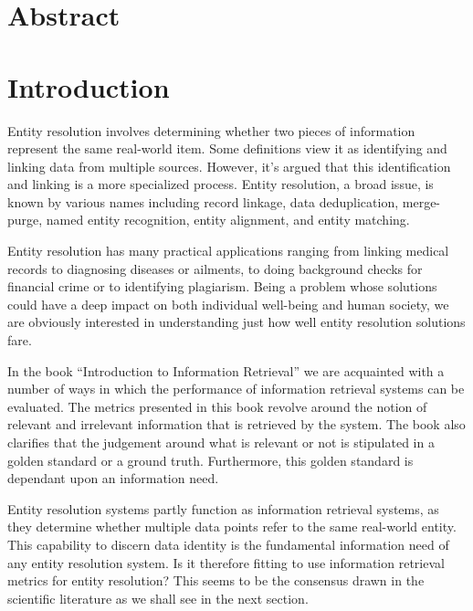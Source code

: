\documentclass[11pt]{article}
\begin{document}
    \theoremstyle{definition}
    \newtheorem{defn}{Definition}[section]
    
    \section{Abstract}\label{sec:abstract}


    \section{Introduction}\label{sec:introduction}
    Entity resolution involves determining whether two pieces of information
    represent the same real-world item.
    Some definitions view it as identifying and linking data from multiple
    sources\cite{Qia17}.
    However, it's argued that this identification and linking is a more
    specialized process\cite{Tal11}.
    Entity resolution, a broad issue, is known by various names including record
    linkage, data deduplication, merge-purge, named entity recognition, entity
    alignment, and entity matching.

    Entity resolution has many practical applications ranging from linking
    medical records to diagnosing diseases or ailments, to doing background
    checks for financial crime or to identifying plagiarism.
    Being a problem whose solutions could have a deep impact on both individual
    well-being and human society, we are obviously interested in understanding
    just how well entity resolution solutions fare.

    In the book ``Introduction to Information Retrieval'' we are acquainted with
    a number of ways in which the performance of information retrieval systems
    can be evaluated\cite{manning2008}.
    The metrics presented in this book revolve around the notion of relevant and
    irrelevant information that is retrieved by the system.
    The book also clarifies that the judgement around what is relevant or not is
    stipulated in a golden standard or a ground truth.
    Furthermore, this golden standard is dependant upon an information need.

    Entity resolution systems partly function as information retrieval systems,
    as they determine whether multiple data points refer to the same real-world
    entity.
    This capability to discern data identity is the fundamental information need
    of any entity resolution system.
    Is it therefore fitting to use information retrieval metrics for entity
    resolution?
    This seems to be the consensus drawn in the scientific literature as we
    shall see in the next section.
\end{document}
